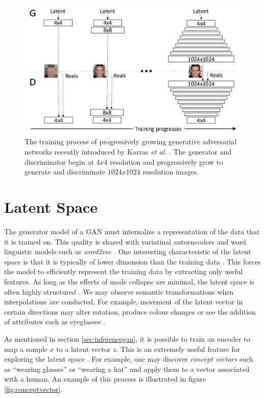 \documentclass[11pt]{article}
\begin{document}
\begin{figure}
\centering
\includegraphics[scale=0.45]{progressive_growing}
\caption{The training process of progressively growing generative adversarial networks recently introduced by Karras \textit{et al.} \citep{2017arXiv171010196K}. The generator and discriminator begin at $4x4$ resolution and progressively grow to generate and discriminate $1024x1024$ resolution images.}
\label{fig:ProgressiveGrowingGAN}
\end{figure}



\section{Latent Space} \label{sed:latentspace}
The generator model of a GAN must internalize a representation of the data that it is trained on. This quality is shared with variatinal autoencoders and word linguistic models such as \textit{word2vec} \citep{2017arXiv171007035C}. One interesting characteristic of the latent space is that it is typically of lower dimension than the training data \citep{2017arXiv171007035C}. This forces the model to efficiently represent the training data by extracting only useful features. As long as the effects of mode collapse are minimal, the latent space is often highly structured \citep{2017arXiv171007035C}. We may observe semantic transformations when interpolations are conducted. For example, movement of the latent vector in certain directions may alter rotation, produce colour changes or see the addition of attributes such as eyeglasses \citep{2017arXiv171007035C}.

As mentioned in section \ref{sec:inferencegan}, it is possible to train an encoder to map a sample $x$ to a latent vector $z$. This is an extremely useful feature for exploring the latent space \citep{2017arXiv171007035C}. For example, one may discover \textit{concept vectors} such as ``wearing glasses'' or ``wearing a hat'' and apply them to a vector associated with a human. An example of this process is illustrated in figure \ref{fig:conceptvector}.
\end{document}
